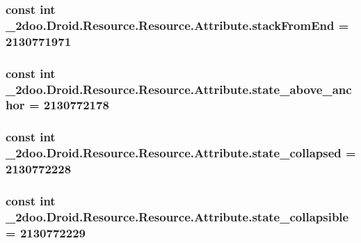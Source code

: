 \hypertarget{class__2doo_1_1_droid_1_1_resource_1_1_attribute_3981901a848c8faac44512e03a50bb3e}{
\subsubsection[{stackFromEnd}]{\setlength{\rightskip}{0pt plus 5cm}const int \_\-2doo.Droid.Resource.Resource.Attribute.stackFromEnd = 2130771971}}
\label{class__2doo_1_1_droid_1_1_resource_1_1_attribute_3981901a848c8faac44512e03a50bb3e}


\hypertarget{class__2doo_1_1_droid_1_1_resource_1_1_attribute_c3a6ecef344690a03858a122656e8b70}{
\subsubsection[{state\_\-above\_\-anchor}]{\setlength{\rightskip}{0pt plus 5cm}const int \_\-2doo.Droid.Resource.Resource.Attribute.state\_\-above\_\-anchor = 2130772178}}
\label{class__2doo_1_1_droid_1_1_resource_1_1_attribute_c3a6ecef344690a03858a122656e8b70}


\hypertarget{class__2doo_1_1_droid_1_1_resource_1_1_attribute_5971e4c2e038211ca9dcc75316b375aa}{
\subsubsection[{state\_\-collapsed}]{\setlength{\rightskip}{0pt plus 5cm}const int \_\-2doo.Droid.Resource.Resource.Attribute.state\_\-collapsed = 2130772228}}
\label{class__2doo_1_1_droid_1_1_resource_1_1_attribute_5971e4c2e038211ca9dcc75316b375aa}


\hypertarget{class__2doo_1_1_droid_1_1_resource_1_1_attribute_e1c861d41e884c9afbb64c3890e248aa}{
\subsubsection[{state\_\-collapsible}]{\setlength{\rightskip}{0pt plus 5cm}const int \_\-2doo.Droid.Resource.Resource.Attribute.state\_\-collapsible = 2130772229}}
\label{class__2doo_1_1_droid_1_1_resource_1_1_attribute_e1c861d41e884c9afbb64c3890e248aa}


